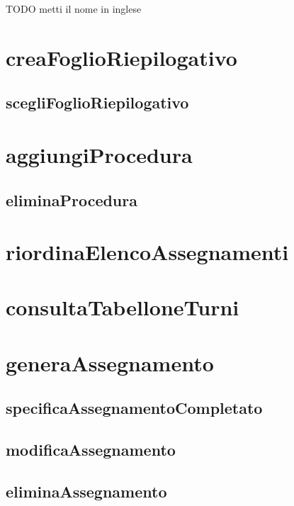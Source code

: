 \color{red}\huge{TODO metti il nome in inglese}\color{black}
\section{creaFoglioRiepilogativo}

\subsection{scegliFoglioRiepilogativo}

\section{aggiungiProcedura}

\subsection{eliminaProcedura}

\section{riordinaElencoAssegnamenti}

\section{consultaTabelloneTurni}

\section{generaAssegnamento}

\subsection{specificaAssegnamentoCompletato}

\subsection{modificaAssegnamento}

\subsection{eliminaAssegnamento}